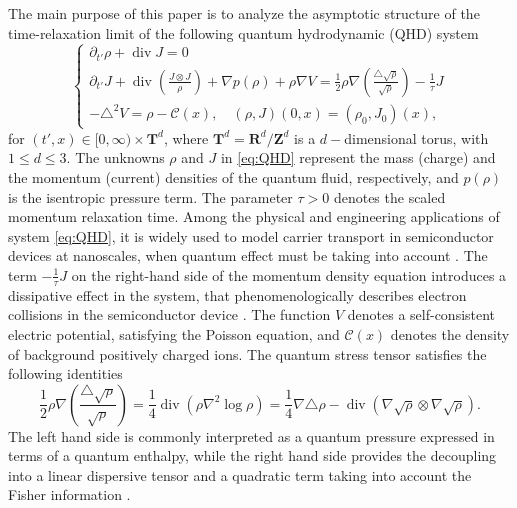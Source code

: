 \documentclass[english]{amsart}
\theoremstyle{plain}
\theoremstyle{definition}
\theoremstyle{remark}
\theoremstyle{plain}
\theoremstyle{plain}
\theoremstyle{plain}
\def\R{{\mathbf R}}%
\def\T{{\mathbf T}}%
\def\Z{{\mathbf Z}}%
\def\d{{\partial}}
\DeclareMathOperator{\diver}{div}
\numberwithin{equation}{section}
\begin{document}
The main purpose of this paper is to analyze the asymptotic structure of the time-relaxation limit of the following quantum hydrodynamic (QHD) system
\begin{equation}\label{eq:QHD}
\begin{cases}
\d_{t'}\rho+\diver J=0\\
\d_{t'}J+\diver\left(\frac{J\otimes J}{\rho}\right)+\nabla p(\rho)+\rho\nabla V=\frac{1}{2}\rho\nabla\left(\frac{\triangle\sqrt\rho}{\sqrt\rho}\right)-\frac{1}{\tau}J\\
-\triangle^2V=\rho-\mathcal{C}(x),\quad (\rho,J)(0,x)=(\rho_0,J_0)(x),
\end{cases}
\end{equation}
for $(t',x)\in[0,\infty)\times {\T^d}$, where ${\T^d}=\R^d/\Z^d$ is a $d-$dimensional torus, with $1\le d\leq 3$. The unknowns $\rho$ and $J$ in \eqref{eq:QHD} represent the mass (charge) and the momentum (current) densities of the quantum fluid, respectively, and $p(\rho)$ is the isentropic pressure term. The parameter $\tau>0$ denotes the scaled momentum relaxation time. Among the physical and engineering applications of system \eqref{eq:QHD}, it is widely used to model carrier transport in semiconductor devices \cite{J} at nanoscales, when quantum effect must be taking into account \cite{AI, G}. 
The term $-\frac{1}{\tau}J$ on the right-hand side of the momentum density equation introduces a dissipative effect in the system, that phenomenologically describes electron collisions in the semiconductor device \cite{AT, BW}.
The function $V$ denotes a self-consistent electric potential, satisfying the Poisson equation, and $\mathcal{C}(x)$ denotes the density of background positively charged ions. 
The quantum stress tensor satisfies the following identities
\begin{equation}\label{eq:bohm}
\frac12\rho\nabla\left(\frac{\triangle\sqrt{\rho}}{\sqrt{\rho}}\right)=\frac14\diver(\rho\nabla^2\log\rho)=\frac14\nabla\triangle\rho-\diver(\nabla\sqrt{\rho}\otimes\nabla\sqrt\rho).
\end{equation}
The left hand side is commonly interpreted as a quantum pressure expressed in terms of a quantum enthalpy, while the right hand side provides the decoupling into a linear dispersive tensor and a quadratic term taking into account the Fisher information \cite{HC}.
\end{document}
